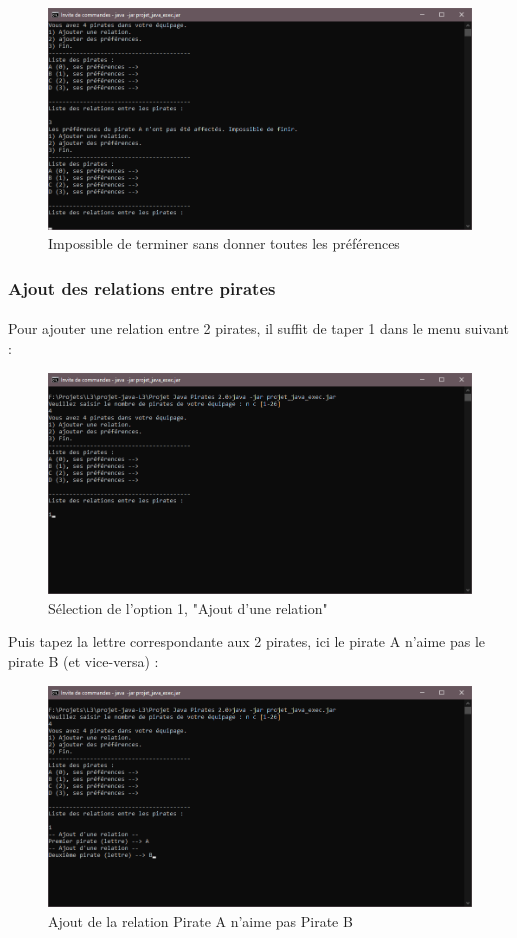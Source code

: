 \documentclass[12pt]{article}
\begin{document}
\begin{figure}[H]
\includegraphics[width=16cm]{erreur_pref}
\centering
\caption{Impossible de terminer sans donner toutes les préférences}
\end{figure}


\subsubsection{Ajout des relations entre pirates}
\paragraph{} Pour ajouter une relation entre 2 pirates, il suffit de taper 1 dans le menu suivant :
\begin{figure}[H]
\includegraphics[width=16cm]{ajout_relation_1}
\centering
\caption{Sélection de l'option 1, "Ajout d'une relation"}
\end{figure}
Puis tapez la lettre correspondante aux 2 pirates, ici le pirate A n'aime pas le pirate B (et vice-versa) :
\begin{figure}[H]
\includegraphics[width=16cm]{ajout_relation_2}
\centering
\caption{Ajout de la relation Pirate A n'aime pas Pirate B}
\end{figure}
\end{document}
